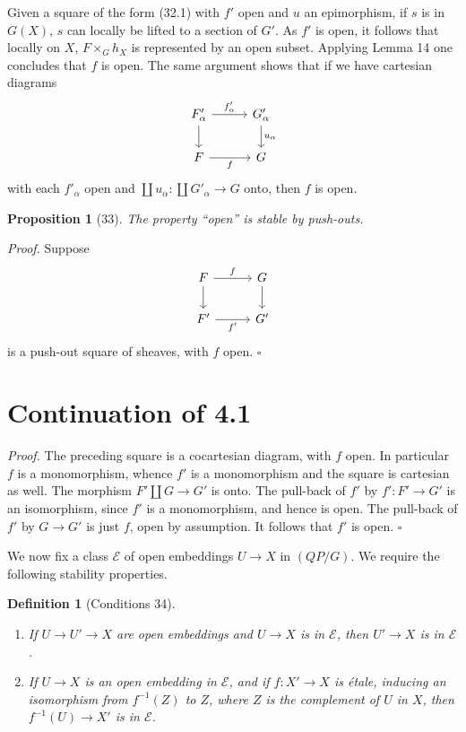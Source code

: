 \documentclass[11pt]{article}
\theoremstyle{deligne}
\newtheorem*{proposition*}{Proposition}
\newtheorem*{definition*}{Definition}
\newenvironment{proofdel}{\noindent\textit{Proof.}}{\hfill$\square$}
\begin{document}
Given a square of the form (32.1) with \(f'\) open and \(u\) an epimorphism, if \(s\) is in \(G(X)\), \(s\) can locally be lifted to a section of \(G'\). As \(f'\) is open, it follows that locally on \(X\), \(F\times_G h_X\) is represented by an open subset. Applying Lemma 14 one concludes that \(f\) is open. The same argument shows that if we have cartesian diagrams
\[
\begin{tikzcd}[column sep=2.8em,row sep=1.8em]
F'_\alpha \arrow[r,"f'_\alpha"] \arrow[d] & G'_\alpha \arrow[d,"u_\alpha"] \\
F \arrow[r,"f"'] & G
\end{tikzcd}
\]
with each \(f'_\alpha\) open and \(\coprod u_\alpha:\coprod G'_\alpha\to G\) onto, then \(f\) is open.

\begin{proposition*}[33]
The property ``open'' is stable by push-outs.
\end{proposition*}

\begin{proofdel}
Suppose
\[
\begin{tikzcd}[column sep=2.8em,row sep=1.8em]
F \arrow[r,"f"] \arrow[d] & G \arrow[d] \\
F' \arrow[r,"f'"'] & G'
\end{tikzcd}
\]
is a push-out square of sheaves, with \(f\) open.
\end{proofdel}

\section*{Continuation of 4.1}

\begin{proofdel}
The preceding square is a cocartesian diagram, with \(f\) open. In particular \(f\) is a monomorphism, whence \(f'\) is a monomorphism and the square is cartesian as well. The morphism \(F'\amalg G\to G'\) is onto. The pull-back of \(f'\) by \(f':F'\to G'\) is an isomorphism, since \(f'\) is a monomorphism, and hence is open. The pull-back of \(f'\) by \(G\to G'\) is just \(f\), open by assumption. It follows that \(f'\) is open.
\end{proofdel}

We now fix a class \(\mathcal E\) of open embeddings \(U\to X\) in \((QP/G)\). We require the following stability properties.

\begin{definition*}[Conditions 34]
\begin{enumerate}[label=\arabic*.]
\item If \(U\to U'\to X\) are open embeddings and \(U\to X\) is in \(\mathcal E\), then \(U'\to X\) is in \(\mathcal E\).
\item If \(U\to X\) is an open embedding in \(\mathcal E\), and if \(f:X'\to X\) is étale, inducing an isomorphism from \(f^{-1}(Z)\) to \(Z\), where \(Z\) is the complement of \(U\) in \(X\), then \(f^{-1}(U)\to X'\) is in \(\mathcal E\).
\end{enumerate}
\end{definition*}
\end{document}
